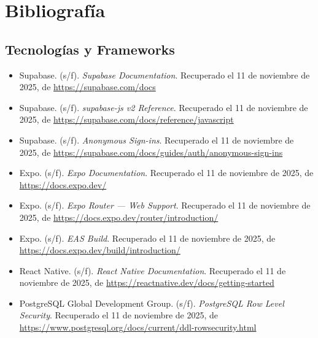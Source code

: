 \chapter{Bibliografía}

\section{Tecnologías y Frameworks}

\begin{itemize}[leftmargin=1.5em]
  \item Supabase. (s/f). \textit{Supabase Documentation}.
        Recuperado el 11 de noviembre de 2025, de
        \url{https://supabase.com/docs}

  \item Supabase. (s/f). \textit{supabase-js v2 Reference}.
        Recuperado el 11 de noviembre de 2025, de
        \url{https://supabase.com/docs/reference/javascript}

  \item Supabase. (s/f). \textit{Anonymous Sign-ins}.
        Recuperado el 11 de noviembre de 2025, de
        \url{https://supabase.com/docs/guides/auth/anonymous-sign-ins}

  \item Expo. (s/f). \textit{Expo Documentation}.
        Recuperado el 11 de noviembre de 2025, de
        \url{https://docs.expo.dev/}

  \item Expo. (s/f). \textit{Expo Router — Web Support}.
        Recuperado el 11 de noviembre de 2025, de
        \url{https://docs.expo.dev/router/introduction/}

  \item Expo. (s/f). \textit{EAS Build}.
        Recuperado el 11 de noviembre de 2025, de
        \url{https://docs.expo.dev/build/introduction/}

  \item React Native. (s/f). \textit{React Native Documentation}.
        Recuperado el 11 de noviembre de 2025, de
        \url{https://reactnative.dev/docs/getting-started}

  \item PostgreSQL Global Development Group. (s/f).
        \textit{PostgreSQL Row Level Security}.
        Recuperado el 11 de noviembre de 2025, de
        \url{https://www.postgresql.org/docs/current/ddl-rowsecurity.html}
\end{itemize}

